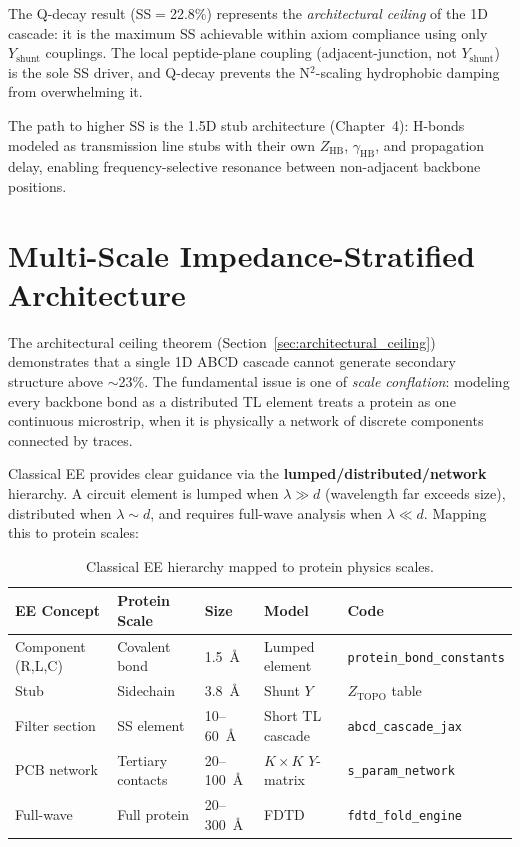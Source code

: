 \noindent The Q-decay result (SS$=$22.8\%) represents the \emph{architectural ceiling} of the 1D cascade: it is the maximum SS achievable within axiom compliance using only $Y_\text{shunt}$ couplings.  The local peptide-plane coupling (adjacent-junction, not $Y_\text{shunt}$) is the sole SS driver, and Q-decay prevents the N$^2$-scaling hydrophobic damping from overwhelming it.

The path to higher SS is the 1.5D stub architecture (Chapter~4): H-bonds modeled as transmission line stubs with their own $Z_\text{HB}$, $\gamma_\text{HB}$, and propagation delay, enabling frequency-selective resonance between non-adjacent backbone positions.



\section{Multi-Scale Impedance-Stratified Architecture}
\label{sec:multiscale_architecture}

The architectural ceiling theorem (Section~\ref{sec:architectural_ceiling}) demonstrates that a single 1D ABCD cascade cannot generate secondary structure above $\sim$23\%.  The fundamental issue is one of \emph{scale conflation}: modeling every backbone bond as a distributed TL element treats a protein as one continuous microstrip, when it is physically a network of discrete components connected by traces.

Classical EE provides clear guidance via the \textbf{lumped/distributed/network} hierarchy.  A circuit element is lumped when $\lambda \gg d$ (wavelength far exceeds size), distributed when $\lambda \sim d$, and requires full-wave analysis when $\lambda \ll d$.  Mapping this to protein scales:

\begin{table}[H]
\centering
\caption{Classical EE hierarchy mapped to protein physics scales.}
\label{tab:multiscale_mapping}
\small
\begin{tabular}{@{}l l l l l@{}}
\toprule
\textbf{EE Concept} & \textbf{Protein Scale} & \textbf{Size} & \textbf{Model} & \textbf{Code} \\
\midrule
Component (R,L,C) & Covalent bond & 1.5~\AA & Lumped element & \texttt{protein\_bond\_constants} \\
Stub & Sidechain & 3.8~\AA & Shunt $Y$ & $Z_\text{TOPO}$ table \\
Filter section & SS element & 10--60~\AA & Short TL cascade & \texttt{abcd\_cascade\_jax} \\
PCB network & Tertiary contacts & 20--100~\AA & $K \times K$ $Y$-matrix & \texttt{s\_param\_network} \\
Full-wave & Full protein & 20--300~\AA & FDTD & \texttt{fdtd\_fold\_engine} \\
\bottomrule
\end{tabular}
\end{table}

